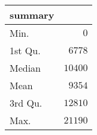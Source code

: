 \begin{table}[!tbp]
\begin{center}
\begin{tabular}{lr}
\hline\hline
\multicolumn{1}{l}{summary}&\multicolumn{1}{c}{}\tabularnewline
\hline
Min.&$    0$\tabularnewline
1st Qu.&$ 6778$\tabularnewline
Median&$10400$\tabularnewline
Mean&$ 9354$\tabularnewline
3rd Qu.&$12810$\tabularnewline
Max.&$21190$\tabularnewline
\hline
\end{tabular}\end{center}

\end{table}
